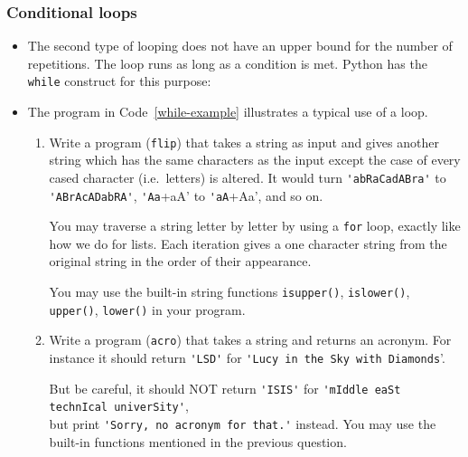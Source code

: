 \documentclass[a4paper]{article}
\begin{document}
\subsubsection{Conditional loops}

\begin{itemize}

\item The second type of looping does not have an upper bound for the number of
repetitions. The loop runs as long as a condition is met. Python has the
\Verb+while+ construct for this purpose:

\item The program in Code~\ref{while-example} illustrates a typical use of a
 loop. 


\begin{uexercise}\label{excontainers}
\begin{enumerate}

\item Write a program (\Verb+flip+) that takes a string as input and gives
another string which has the same characters as the input except 
the case of every cased character (i.e.\ letters) is altered. 
It would turn 
\Verb+'abRaCadABra'+
 to
\Verb+'ABrAcADabRA'+,   
\Verb+'Aa++aA' to \Verb+'aA++Aa', and so on.

You may traverse a string letter by letter by using a \Verb+for+ loop, exactly
like how we do for lists. Each iteration gives a one character string from the
original string in the order of their appearance.

You may use the built-in string functions \Verb+isupper()+, \Verb+islower()+,
\Verb+upper()+, \Verb+lower()+ in your program. 

\item
Write a program (\Verb+acro+) that takes a string and returns an acronym.
For instance it should return \Verb+'LSD'+ for 
\Verb+'Lucy in the Sky with Diamonds+'. 

But be careful, it should NOT return \Verb+'ISIS'+ for \Verb+'mIddle eaSt technIcal univerSity'+, \\ but print \Verb+'Sorry, no acronym for that.'+
instead. You may use the built-in functions mentioned in the previous question.


\end{enumerate}
\end{uexercise}
\end{itemize}
\end{document}
